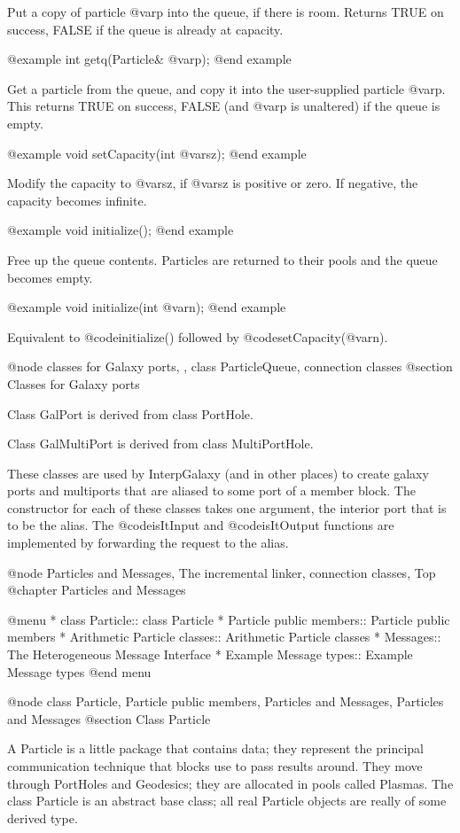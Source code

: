 Put a copy of particle @var{p} into the queue, if there is room.
Returns TRUE on success, FALSE if the queue is already at capacity.

@example
int getq(Particle& @var{p});
@end example

Get a particle from the queue, and copy it into the user-supplied
particle @var{p}.  This returns TRUE on success, FALSE (and @var{p}
is unaltered) if the queue is empty.

@example
void setCapacity(int @var{sz});
@end example

Modify the capacity to @var{sz}, if @var{sz} is positive or zero.  If
negative, the capacity becomes infinite.

@example
void initialize();
@end example

Free up the queue contents.  Particles are returned to their pools and
the queue becomes empty.

@example
void initialize(int @var{n});
@end example

Equivalent to @code{initialize()} followed by @code{setCapacity(@var{n})}.

@node classes for Galaxy ports,  , class ParticleQueue, connection classes
@section Classes for Galaxy ports

Class GalPort is derived from class PortHole.

Class GalMultiPort is derived from class MultiPortHole.

These classes are used by InterpGalaxy (and in other places) to create
galaxy ports and multiports that are aliased to some port of a member
block.  The constructor for each of these classes takes one argument,
the interior port that is to be the alias.  The @code{isItInput} and
@code{isItOutput} functions are implemented by forwarding the request
to the alias.

@node Particles and Messages, The incremental linker, connection classes, Top
@chapter Particles and Messages

@menu
* class Particle::              class Particle
* Particle public members::     Particle public members
* Arithmetic Particle classes::  Arithmetic Particle classes
* Messages::                    The Heterogeneous Message Interface
* Example Message types::       Example Message types
@end menu

@node class Particle, Particle public members, Particles and Messages, Particles and Messages
@section Class Particle

A Particle is a little package that contains data; they represent the
principal communication technique that blocks use to pass results
around.  They move through PortHoles and Geodesics; they are allocated
in pools called Plasmas.  The class Particle is an abstract base class;
all real Particle objects are really of some derived type.

